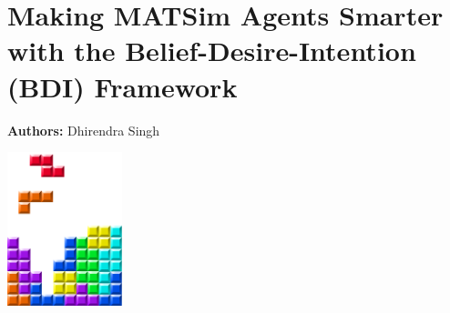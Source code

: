 \chapter{Making MATSim Agents Smarter with the Belief-Desire-Intention (BDI) Framework  }
\label{ch:bdi}

\hfill \textbf{Authors:} Dhirendra Singh

\begin{center} \includegraphics[width=0.25\textwidth, angle=0]{figures/MATSimBook.png} \end{center}








